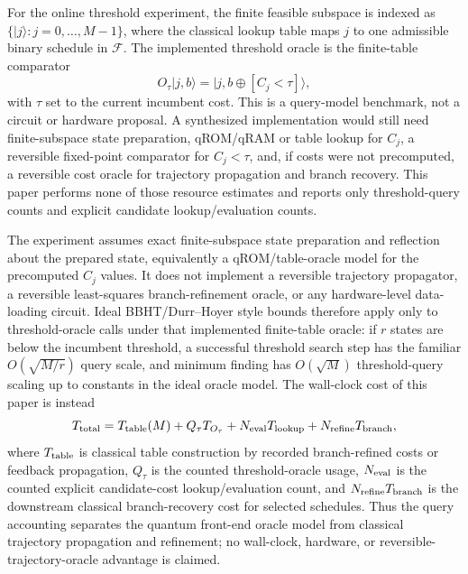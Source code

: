 \documentclass[preprint,12pt]{elsarticle}
\begin{document}
For the online threshold experiment, the finite feasible subspace is indexed as $\{|j\rangle:j=0,\ldots,M-1\}$, where the classical lookup table maps $j$ to one admissible binary schedule in $\mathcal{F}$. The implemented threshold oracle is the finite-table comparator
\begin{equation}
O_\tau |j,b\rangle = |j, b\oplus [C_j < \tau]\rangle ,
\end{equation}
with $\tau$ set to the current incumbent cost. This is a query-model benchmark, not a circuit or hardware proposal. A synthesized implementation would still need finite-subspace state preparation, qROM/qRAM or table lookup for $C_j$, a reversible fixed-point comparator for $C_j<\tau$, and, if costs were not precomputed, a reversible cost oracle for trajectory propagation and branch recovery. This paper performs none of those resource estimates and reports only threshold-query counts and explicit candidate lookup/evaluation counts.

The experiment assumes exact finite-subspace state preparation and reflection about the prepared state, equivalently a qROM/table-oracle model for the precomputed $C_j$ values. It does not implement a reversible trajectory propagator, a reversible least-squares branch-refinement oracle, or any hardware-level data-loading circuit. Ideal BBHT/Durr--Hoyer style bounds therefore apply only to threshold-oracle calls under that implemented finite-table oracle: if $r$ states are below the incumbent threshold, a successful threshold search step has the familiar $O(\sqrt{M/r})$ query scale, and minimum finding has $O(\sqrt{M})$ threshold-query scaling up to constants in the ideal oracle model. The wall-clock cost of this paper is instead
\begin{equation}
T_{\rm total}=T_{\rm table}(M)+Q_\tau T_{O_\tau}+N_{\rm eval}T_{\rm lookup}+N_{\rm refine}T_{\rm branch},
\end{equation}
where $T_{\rm table}$ is classical table construction by recorded branch-refined costs or feedback propagation, $Q_\tau$ is the counted threshold-oracle usage, $N_{\rm eval}$ is the counted explicit candidate-cost lookup/evaluation count, and $N_{\rm refine}T_{\rm branch}$ is the downstream classical branch-recovery cost for selected schedules. Thus the query accounting separates the quantum front-end oracle model from classical trajectory propagation and refinement; no wall-clock, hardware, or reversible-trajectory-oracle advantage is claimed.
\end{document}
